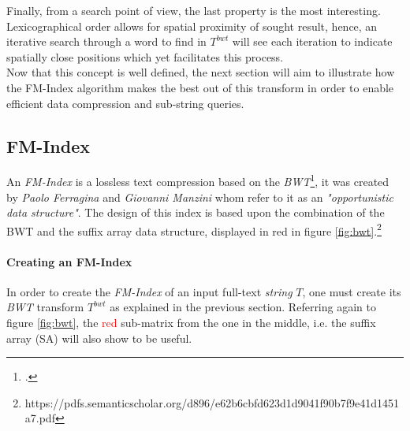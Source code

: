 Finally, from a search point of view, the last property is the most interesting. Lexicographical order allows for spatial proximity of sought result, hence, an iterative search through a word to find in $T^{bwt}$ will see each iteration to indicate spatially close positions which yet facilitates this process.\\

Now that this concept is well defined, the next section will aim to illustrate how the FM-Index algorithm makes the best out of this transform in order to enable efficient data compression and sub-string queries.

\subsection{FM-Index}

An \textsl{FM-Index} is a lossless text compression based on the \textsl{BWT}\footcite{FM_INDEX}, it was created by \textsl{Paolo Ferragina} and \textsl{Giovanni Manzini} whom refer to it as an \textit{"opportunistic data structure"}. The design of this index is based upon the combination of the BWT and the suffix array data structure, displayed in red in figure \ref{fig:bwt}.\footnote{https://pdfs.semanticscholar.org/d896/e62b6cbfd623d1d9041f90b7f9e41d1451a7.pdf}

\paragraph{Creating an FM-Index}

In order to create the \textsl{FM-Index} of an input full-text \textit{string} $T$, one must create its \textsl{BWT} transform $T^{bwt}$ as explained in the previous section. Referring again to figure \ref{fig:bwt}, the \textcolor{red}{red} sub-matrix from the one in the middle, i.e. the suffix array (SA) will also show to be useful.


